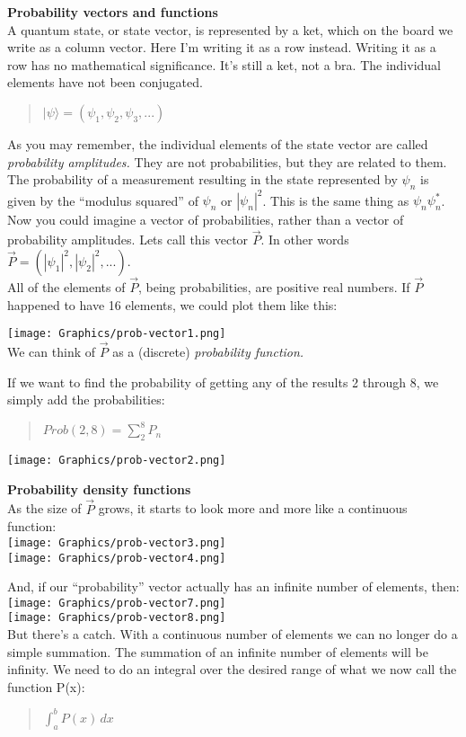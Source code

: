 \documentclass{article}
\def\ket#1{|#1\rangle}
\newcommand{\head}[1]{ \vspace{12pt} {\bf #1} \vspace{-12pt}\\ }
\def\p{ \vspace{10pt}\\ }
\begin{document}
\pagebreak

\head{Probability vectors and functions}

A quantum state, or state vector,
is represented by a ket, which on the board we write
as a column vector. Here I'm writing it as a row instead. Writing it as
a row has no mathematical significance. It's still a ket, not a bra.
The individual elements have not been conjugated.

\begin{quote}
$\ket{\psi} = ( \psi_1, \psi_2, \psi_3, ... )$
\end{quote}

As you may remember, the individual elements of the state vector are
called {\it probability amplitudes.} They are not probabilities, but they
are related to them. The probability of a measurement resulting in the
state represented by $\psi_n$ is given by the ``modulus squared'' of
$\psi_n$ or $|\psi_n|^2$. This is the same thing as $\psi_n \psi_n^*$.
\p
Now you could imagine a vector of probabilities, rather than a vector of
probability amplitudes. Lets call this vector $\vec{P}$. In other words
$\vec{P} = ( |\psi_1|^2, |\psi_2|^2, ...)$.
\p
All of the elements of $\vec{P}$, being probabilities, are positive real
numbers. If $\vec{P}$ happened to have 16 elements, we could plot them
like this:

\texttt{[image: Graphics/prob-vector1.png]}
\p
We can think of $\vec{P}$ as a (discrete) {\it probability function.}

\pagebreak

If we want to find the probability of getting any of the results 2
through 8, we simply add the probabilities:
\begin{quote}
    $Prob(2,8) = \sum_2^8 P_n$
\end{quote}
\texttt{[image: Graphics/prob-vector2.png]}

\head{Probability density functions}

As the size of $\vec{P}$ grows, it starts to look more and more like a
continuous function:
\p
\texttt{[image: Graphics/prob-vector3.png]}
\p
\texttt{[image: Graphics/prob-vector4.png]}

\pagebreak
And, if our ``probability'' vector actually has an infinite number of
elements, then:
\p
\texttt{[image: Graphics/prob-vector7.png]}
\p
\texttt{[image: Graphics/prob-vector8.png]}
\p
But there's a catch. With a continuous number of elements we can
no longer do a simple summation. The summation of an infinite number
of elements will be infinity. We need to do an integral over the desired
range of what we now call the function P(x):
\begin{quote}
    $\int_a^b P(x)\, dx$
\end{quote}
\end{document}
